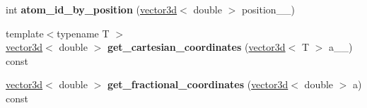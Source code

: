 \begin{DoxyCompactItemize}
\item 
\hypertarget{classsirius_1_1_unit__cell_acb3c2e7ce19e1ad8f333698ea6133348}{}int {\bfseries atom\+\_\+id\+\_\+by\+\_\+position} (\hyperlink{classgeometry3d_1_1vector3d}{vector3d}$<$ double $>$ position\+\_\+\+\_\+)\label{classsirius_1_1_unit__cell_acb3c2e7ce19e1ad8f333698ea6133348}

\item 
\hypertarget{classsirius_1_1_unit__cell_ad0e1f0623e546487f4c6497a673c0818}{}{\footnotesize template$<$typename T $>$ }\\\hyperlink{classgeometry3d_1_1vector3d}{vector3d}$<$ double $>$ {\bfseries get\+\_\+cartesian\+\_\+coordinates} (\hyperlink{classgeometry3d_1_1vector3d}{vector3d}$<$ T $>$ a\+\_\+\+\_\+) const \label{classsirius_1_1_unit__cell_ad0e1f0623e546487f4c6497a673c0818}

\item 
\hypertarget{classsirius_1_1_unit__cell_a09fdd698713316ea80eededa7ae6a03b}{}\hyperlink{classgeometry3d_1_1vector3d}{vector3d}$<$ double $>$ {\bfseries get\+\_\+fractional\+\_\+coordinates} (\hyperlink{classgeometry3d_1_1vector3d}{vector3d}$<$ double $>$ a) const \label{classsirius_1_1_unit__cell_a09fdd698713316ea80eededa7ae6a03b}


\end{DoxyCompactItemize}
